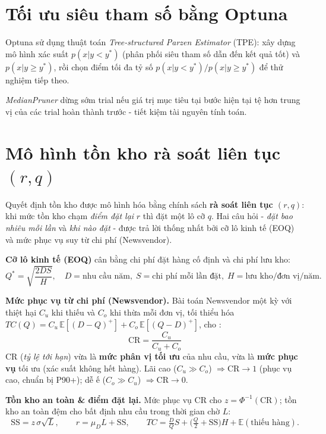 \documentclass[12pt, a4paper]{report}
\newcommand{\CR}{\ensuremath{\mathrm{CR}}}
\newcommand{\Cu}{\ensuremath{C_u}}
\newcommand{\Co}{\ensuremath{C_o}}
\begin{document}
\section{Tối ưu siêu tham số bằng Optuna}

Optuna \cite{akiba2019optuna} sử dụng thuật toán \textit{Tree-structured Parzen Estimator} (TPE): xây dựng mô hình xác suất $p(x|y<y^*)$ (phân phối siêu tham số dẫn đến kết quả tốt) và $p(x|y \geq y^*)$, rồi chọn điểm tối đa tỷ số $p(x|y<y^*) / p(x|y \geq y^*)$ để thử nghiệm tiếp theo.

\textit{MedianPruner} dừng sớm trial nếu giá trị mục tiêu tại bước hiện tại tệ hơn trung vị của các trial hoàn thành trước - tiết kiệm tài nguyên tính toán.

\section{Mô hình tồn kho rà soát liên tục $(r,q)$}
\label{sec:inventory_theory}

Quyết định tồn kho được mô hình hóa bằng chính sách \textbf{rà soát liên tục $(r,q)$}: khi mức tồn kho chạm \textit{điểm đặt lại} $r$ thì đặt một lô cỡ $q$. Hai câu hỏi - \textit{đặt bao nhiêu mỗi lần} và \textit{khi nào đặt} - được trả lời thống nhất bởi cỡ lô kinh tế (EOQ) và mức phục vụ suy từ chi phí (Newsvendor).

\textbf{Cỡ lô kinh tế (EOQ)} \cite{harris1913many} cân bằng chi phí đặt hàng cố định và chi phí lưu kho:
\begin{equation}
  Q^* = \sqrt{\frac{2DS}{H}}, \quad D = \text{nhu cầu năm},\; S = \text{chi phí mỗi lần đặt},\; H = \text{lưu kho/đơn vị/năm}.
\end{equation}

\textbf{Mức phục vụ từ chi phí (Newsvendor).} Bài toán Newsvendor một kỳ \cite{arrow1951optimal} với thiệt hại $\Cu$ khi thiếu và $\Co$ khi thừa mỗi đơn vị, tối thiểu hóa $TC(Q)=\Cu\,\mathbb{E}[(D{-}Q)^+]+\Co\,\mathbb{E}[(Q{-}D)^+]$, cho \cite{porteus2002foundations}:
\begin{equation}
  \boxed{\CR = \frac{\Cu}{\Cu+\Co}}
\end{equation}
$\CR$ (\textit{tỷ lệ tới hạn}) vừa là \textbf{mức phân vị tối ưu} của nhu cầu, vừa là \textbf{mức phục vụ} tối ưu (xác suất không hết hàng). Lãi cao ($\Cu\gg\Co$) $\Rightarrow \CR\to1$ (phục vụ cao, chuẩn bị P90+); dễ ế ($\Co\gg\Cu$) $\Rightarrow \CR\to0$.

\textbf{Tồn kho an toàn \& điểm đặt lại.} Mức phục vụ $\CR$ cho $z=\Phi^{-1}(\CR)$; tồn kho an toàn đệm cho bất định nhu cầu trong thời gian chờ $L$:
\begin{equation}
  \text{SS} = z\,\sigma\sqrt{L}, \qquad r = \mu_D L + \text{SS}, \qquad
  TC = \tfrac{D}{Q}S + \big(\tfrac{Q}{2}+\text{SS}\big)H + \mathbb{E}(\text{thiếu hàng}).
\end{equation}
\end{document}

